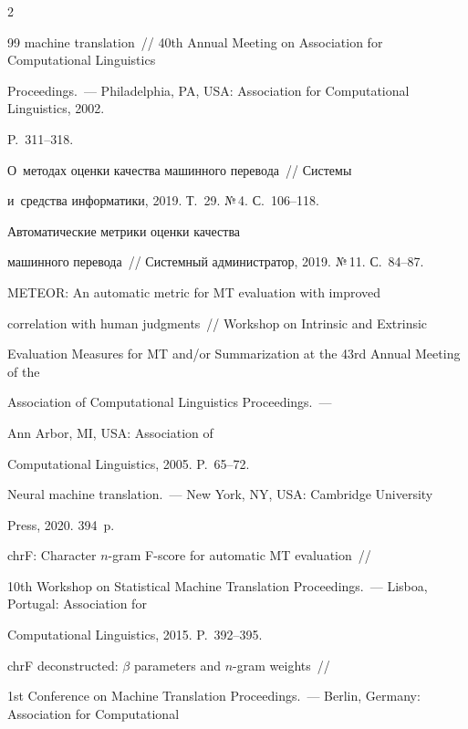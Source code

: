 \begin{multicols}{2}
{{\begin{thebibliography}{99}
machine translation~// 40th Annual Meeting on Association for Computational Linguistics 


Proceedings.~--- Philadelphia, PA, USA: Association for Computational Linguistics, 2002. 


P.~311--318.




 О~методах оценки качества машинного перевода~// Системы 


и~средства информатики, 2019. Т.~29. №\,4. С.~106--118.




 Автоматические метрики оценки качества 


машинного перевода~// Системный администратор, 2019. №\,11. С.~84--87.




 METEOR: An automatic metric for MT evaluation with improved 


correlation with human judgments~// Workshop on Intrinsic and Extrinsic 


Evaluation Measures for MT and/or Summarization at the 43rd Annual Meeting of the 


Association of Computational Linguistics Proceedings.~---


 Ann Arbor, MI, USA: Association of 


Computational Linguistics, 2005. P.~65--72.




 Neural machine translation.~--- New York, NY, USA: Cambridge University 


Press, 2020. 394~p.




 chrF: Character $n$-gram F-score for automatic MT evaluation~//  


10th Workshop on Statistical Machine Translation Proceedings.~--- Lisboa, Portugal: Association for 


Computational Linguistics, 2015. P.~392--395.




 chrF deconstructed: $\beta$ parameters and \mbox{$n$-gram} weights~// 


1st Conference on Machine Translation Proceedings.~--- Berlin, Germany: Association for Computational 



\end{thebibliography}}}
\end{multicols}

